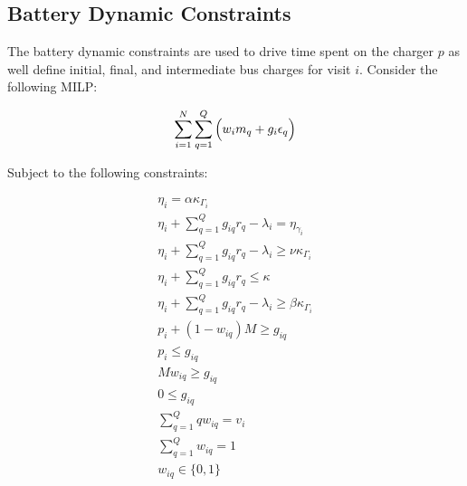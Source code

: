 \documentclass[letterpaper, 10pt, conference]{IEEEtran}
\begin{document}
\subsection{Battery Dynamic Constraints}
The battery dynamic constraints are used to drive time spent on the charger \(p\) as well define initial, final, and intermediate bus charges for visit \(i\). Consider the following MILP:

\begin{equation}
\label{eq:objective}
    \sum_{i=1}^N \sum_{q=1}^Q \Big( w_i m_q + g_i \epsilon_q \Big) \\
\end{equation}

Subject to the following constraints:

\begin{subequations}
\label{eq:dynconstrs}
\begin{align}
    \eta_i = \alpha \kappa_{\Gamma_i}                                         \label{subeq:init_charge}  \\
    \eta_i + \sum_{q=1}^Q g_{iq} r_q - \lambda_i = \eta_{\gamma_i}            \label{subeq:next_charge}  \\
    \eta_i + \sum_{q=1}^Q g_{iq} r_q - \lambda_i \geq \nu \kappa_{\Gamma_i}   \label{subeq:min_charge}   \\
    \eta_i + \sum_{q=1}^Q g_{iq} r_q \leq \kappa                              \label{subeq:max_charge}   \\
    \eta_i + \sum_{q=1}^Q g_{iq} r_q - \lambda_i \geq \beta \kappa_{\Gamma_i} \label{subeq:final_charge} \\
    p_i + (1 - w_{iq})M \geq g_{iq}                                           \label{subeq:gpgret}       \\
    p_i \leq g_{iq}                                                           \label{subeq:gples}        \\
    Mw_{iq} \geq g_{iq}                                                       \label{subeq:gwgret}       \\
    0 \leq g_{iq}                                                             \label{subeq:gwles}        \\
    \sum_{q=1}^Q qw_{iq} = v_i                                                \label{subeq:wmax}         \\
    \sum_{q=1}^Q w_{iq} = 1                                                   \label{subeq:wone}         \\
    w_{iq} \in \{0,1\}                                                        \label{subeq:wspace}
\end{align}
\end{subequations}
\end{document}
